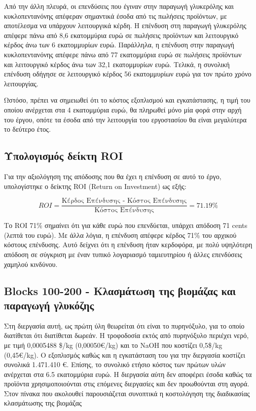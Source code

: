 \documentclass[11pt]{article}
\begin{document}
Από την άλλη πλευρά, οι επενδύσεις που έγιναν στην παραγωγή γλυκερόλης
και κυκλοπεντανόνης απέφεραν σημαντικά έσοδα από τις πωλήσεις προϊόντων,
με αποτέλεσμα να υπάρχουν λειτουργικά κέρδη. Η επένδυση στη παραγωγή
γλυκερόλης απέφερε πάνω από 8,6 εκατομμύρια ευρώ σε πωλήσεις προϊόντων
και λειτουργικό κέρδος άνω των 6 εκατομμυρίων ευρώ. Παράλληλα, η
επένδυση στην παραγωγή κυκλοπεντανόνης απέφερε πάνω από 77 εκατομμύρια
ευρώ σε πωλήσεις προϊόντων και λειτουργικό κέρδος άνω των 32,1
εκατομμυρίων ευρώ. Τελικά, η συνολική επένδυση οδήγησε σε λειτουργικό
κέρδος 56 εκατομμυρίων ευρώ για τον πρώτο χρόνο λειτουργίας.

Ωστόσο, πρέπει να σημειωθεί ότι το κόστος εξοπλισμού και εγκατάστασης, η
τιμή του οποίου ανέρχεται στα 4 εκατομμύρια ευρώ, θα πληρωθεί μόνο μία
φορά στην αρχή του έργου, οπότε τα έσοδα από την λειτουργία του
εργοστασίου θα είναι μεγαλύτερα το δεύτερο έτος.

\subsection{Υπολογισμός δείκτη ROI}
\label{sec:orgc8ce0cb}
Για την αξιολόγηση της απόδοσης που θα έχει η επένδυση σε αυτό το έργο,
υπολογίστηκε ο δείκτης ROI (Return on Investment) ως εξής:

\[ ROI = \frac{\text{Κέρδος Επένδυσης - Κόστος Επένδυσης}}{\text{Κόστος Επένδυσης}} = 71.19 \% \]

Το ROI 71\% σημαίνει ότι για κάθε ευρώ που επενδύεται, υπάρχει απόδοση 71
cents (λεπτά του ευρώ). Με άλλα λόγια, η επένδυση απέφερε κέρδος 71\% του
αρχικού κόστους επένδυσης. Αυτό δείχνει ότι η επένδυση ήταν κερδοφόρα,
με πολύ υψηλότερη απόδοση σε σύγκριση με έναν τυπικό λογαριασμό
ταμιευτηρίου ή άλλες επενδύσεις χαμηλού κινδύνου.

\subsection{Blocks 100-200 - Κλασμάτωση της βιομάζας και παραγωγή γλυκόζης}
\label{sec:org29878d6}
Στη διεργασία αυτή, ως πρώτη ύλη θεωρείται ότι είναι το πυρηνόξυλο, για
το οποίο διατίθεται ότι διατίθεται δωρεάν. Η τροφοδοσία εκτός από
πυρηνόξυλο περιέχει νερό, με τιμή 0,0005488 \$/kg (0,00050€/kg) και το
NaOH που κοστίζει 0,5\$/kg (0,45€/kg). Ο εξοπλισμός καθώς και η
εγκατάσταση του για την διεργασία κοστίζει συνολικά 1.471.410 €. Επίσης,
το συνολικό ετήσιο κόστος των πρώτων υλών ανέρχεται στα 6.5 εκατομμύρια
ευρώ. Η διεργασία αύτη δεν αποφέρει έσοδα καθώς τα προϊόντα
χρησιμοποιούνται στις επόμενες διεργασίες και δεν προωθούνται στη αγορά.
Στον πίνακα που ακολουθεί παρουσιάζεται συνοπτικά η κοστολόγηση της
διαδικασίας κλασμάτωσης της βιομάζας
\end{document}
